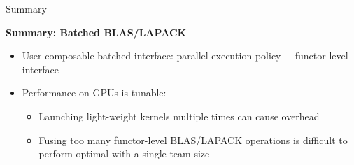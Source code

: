 \begin{frame}[fragile]{Summary}

  \textbf{Summary: Batched BLAS/LAPACK}
  \begin{itemize}
  \item \small{User composable batched interface: parallel execution policy + functor-level interface}
  \item \small{Performance on GPUs is tunable:}
    \begin{itemize}
    \item \small{Launching light-weight kernels multiple times can cause overhead}
    \item \small{Fusing too many functor-level BLAS/LAPACK operations is difficult to perform optimal with a single team size}
    \end{itemize}
  \end{itemize}
  
\end{frame}

